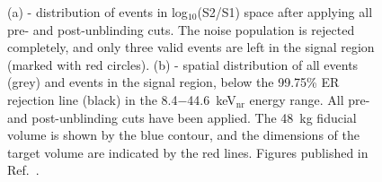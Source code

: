 \begin{figure}[!b]
\centering
{}
\caption[Distribution of events in the first science run using all pre- and post-unblinding cuts]{(a) - distribution of events in log$_{10}$(S2/S1) space after applying all pre- and post-unblinding cuts. The noise population is rejected completely, and only three valid events are left in the signal region (marked with red circles). (b) - spatial distribution of all events (grey) and events in the signal region, below the 99.75\% ER rejection line (black) in the 8.4$-$44.6~keV$_{\mathrm{nr}}$ energy range. All pre- and post-unblinding cuts have been applied. The 48~kg fiducial volume is shown by the blue contour, and the dimensions of the target volume are indicated by the red lines.  Figures published in Ref.~\cite{xe100-run08}.}
\label{figRun08log10signal}
\end{figure}

